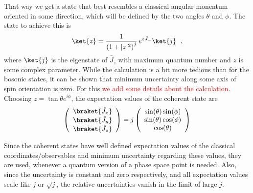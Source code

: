 That way we get a state that best resembles a classical angular monentum oriented in some direction, which will be defined by the two angles $\theta$ and $\phi$.
The state to achieve this is
\begin{equation}
	\ket{z} = \frac{1}{\left( 1 + |z|^2 \right)^j} \, e^{z \hat J_-} \ket{j}~~, \label{eq:coherentState}
\end{equation}
where $\ket{j}$ is the eigenstate of $\hat J_z$ with maximum quantum number and $z$ is some complex parameter.
While the calculation is a bit more tedious than for the bosonic states, it can be shown that minimum uncertainty along some axis of spin orientation is zero.
For this \textcolor{red}{we add some details about the calculation}.
Choosing $z = \tan\theta e^{i\phi}$, the expectation values of the coherent state are
\begin{equation}
	\left(
	\begin{array}{c}
	\braket{\hat J_x}\\
	\braket{\hat J_y}\\
	\braket{\hat J_z}\\
	\end{array}
	\right) 
	= j
	\left(
	\begin{array}{c}
	\sin (\theta) \sin (\phi)\\
	\sin (\theta) \cos(\phi)\\
	\cos(\theta)\\
	\end{array}
	\right)
\end{equation}

Since the coherent states have well defined expectation values of the classical coordinates/observables and minimum uncertainty regarding these values, they are used, whenever a quantum version of a phase space point is needed.
Also, since the uncertainty is constant and zero respectively, and all expectation values scale like $j$ or $\sqrt{j}$, the relative uncertainties vanish  in the limit of large $j$. 

 
